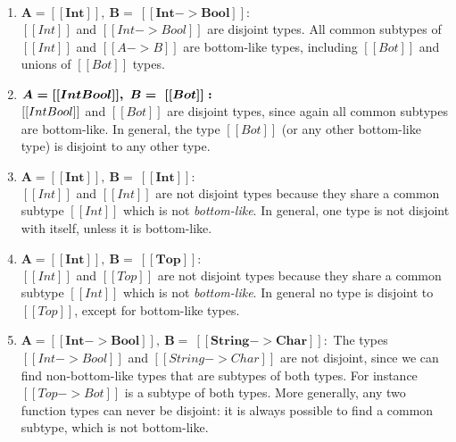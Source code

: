 \begin{enumerate}
  \item $\boldsymbol{A = [[Int]], \ B = \ [[Int -> Bool]]:}$ \\
        $[[Int]]$ and $[[Int -> Bool]]$ are disjoint types. All common subtypes of $[[Int]]$ and $[[A -> B]]$ are bottom-like types,
        including $[[Bot]]$ and unions of $[[Bot]]$ types.
  \item $\boldsymbol{A = [[Int \/ Bool]], \ B = \ [[Bot]]:}$ \\
    $[[Int \/ Bool]]$ and $[[Bot]]$ are disjoint types, since again all common subtypes are bottom-like.
    In general, the type $[[Bot]]$ (or any other bottom-like type)
    is disjoint to any other type.
  \item $\boldsymbol{A = [[Int]], \ B = \ [[Int]]:}$ \\
        $[[Int]]$ and $[[Int]]$ are not disjoint types because they share a common subtype $[[Int]]$ which
        is not \emph{bottom-like}. In general, one type is not disjoint with
        itself, unless it is bottom-like.
  \item $\boldsymbol{A = [[Int]], \ B = \ [[Top]]:}$ \\
        $[[Int]]$ and $[[Top]]$ are not disjoint types because they share a common
    subtype $[[Int]]$ which is not \emph{bottom-like}. In general no type
    is disjoint to $[[Top]]$, except for bottom-like types.
  \item $\boldsymbol{A = [[Int -> Bool]], \ B = \ [[String -> Char]]:}$
    The types $[[Int -> Bool]]$ and $[[String -> Char]]$ are not disjoint,
    since we can find non-bottom-like types that are subtypes
    of both types. For instance $[[Top -> Bot]]$ is a subtype of both types.
    More generally, any two function types can never be disjoint: it is always
    possible to find a common subtype, which is not bottom-like.
    \\
\end{enumerate}

\begin{comment}
\begin{figure}[t]
  \begin{small}
    \centering
    \drules[ad]{$[[A * B]]$}{Algorithmic Disjointness}{btmr, btml, intl, intr, orl, orr}
  \end{small}
  \caption{Algorithmic Disjointness for \cal.}
  \label{fig:union:ad}
\end{figure}
\end{comment}


